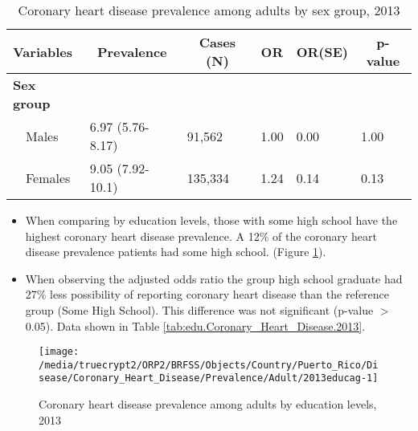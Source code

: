 \begin{table}[H]
\caption{Coronary heart disease prevalence  among adults by sex group, 2013\label{tab:sex.Coronary_Heart_Disease.2013}} 
\begin{center}
\begin{tabular}{llllll}
\hline\hline
\multicolumn{1}{l}{Variables}&\multicolumn{1}{c}{Prevalence}&\multicolumn{1}{c}{Cases (N)}&\multicolumn{1}{c}{OR}&\multicolumn{1}{c}{OR(SE)}&\multicolumn{1}{c}{p-value}\tabularnewline
\hline
{\bfseries Sex group}&&&&&\tabularnewline
~~Males&6.97 (5.76-8.17)& 91,562&1.00&0.00&1.00\tabularnewline
~~Females&9.05 (7.92-10.1)&135,334&1.24&0.14&0.13\tabularnewline
\hline
\end{tabular}\end{center}

\end{table}


\newpage
\begin{itemize}

\item When comparing by education levels, those with
some high school
have the highest coronary heart disease prevalence. A 12\% of the coronary heart disease prevalence patients had some high school.
(Figure \ref{fig:edu.Coronary_Heart_Disease.2013}).

\item 
When observing the adjusted odds ratio the group high school graduate had 27\% less possibility of reporting coronary heart disease than the reference group (Some High School).
This difference was not significant (p-value $>$ 0.05).  Data shown in Table \ref{tab:edu.Coronary_Heart_Disease.2013}.

\end{itemize}

\begin{figure}[H]
\caption{Coronary heart disease prevalence among adults by education levels, 2013}
\begin{knitrout}
\color{fgcolor}

{\centering \texttt{[image: /media/truecrypt2/ORP2/BRFSS/Objects/Country/Puerto\_Rico/Disease/Coronary\_Heart\_Disease/Prevalence/Adult/2013educag-1]} 

}



\end{knitrout}
 \label{fig:edu.Coronary_Heart_Disease.2013}
\end{figure}

